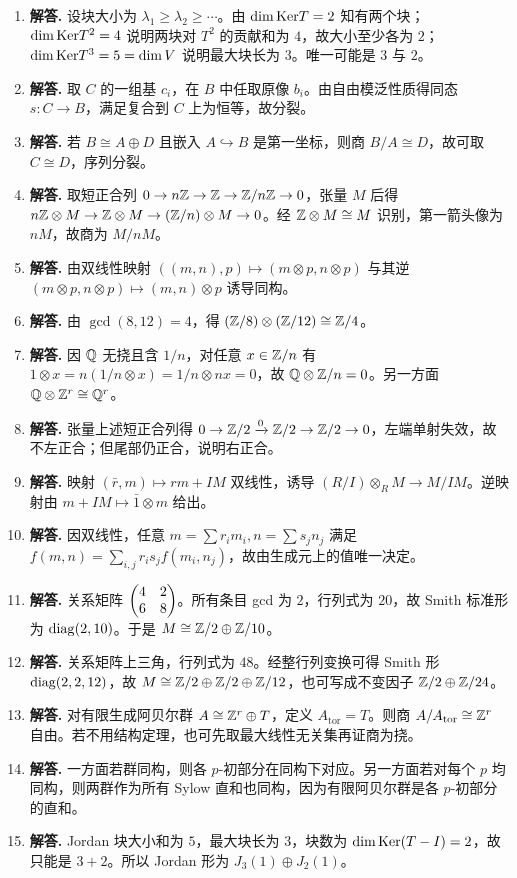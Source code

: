 \begin{enumerate}[label=\textbf{\arabic*.}, leftmargin=*, itemsep=1em]
\item \textbf{解答.} 设块大小为 $\lambda_1\ge\lambda_2\ge\cdots$。由 $\dim\mathrm{Ker} T=2$ 知有两个块；$\dim\mathrm{Ker} T^2=4$ 说明两块对 $T^2$ 的贡献和为 $4$，故大小至少各为 $2$；$\dim\mathrm{Ker} T^3=5=\dim V$ 说明最大块长为 $3$。唯一可能是 $3$ 与 $2$。
\item \textbf{解答.} 取 $C$ 的一组基 $c_i$，在 $B$ 中任取原像 $b_i$。由自由模泛性质得同态 $s:C\to B$，满足复合到 $C$ 上为恒等，故分裂。
\item \textbf{解答.} 若 $B\cong A\oplus D$ 且嵌入 $A\hookrightarrow B$ 是第一坐标，则商 $B/A\cong D$，故可取 $C\cong D$，序列分裂。
\item \textbf{解答.} 取短正合列 $0\to n\mathbb{Z}\to \mathbb{Z}\to \mathbb{Z}/n\mathbb{Z}\to 0$，张量 $M$ 后得 $n\mathbb{Z}\otimes M\to \mathbb{Z}\otimes M\to (\mathbb{Z}/n)\otimes M\to 0$。经 $\mathbb{Z}\otimes M\cong M$ 识别，第一箭头像为 $nM$，故商为 $M/nM$。
\item \textbf{解答.} 由双线性映射
$((m,n),p)\mapsto (m\otimes p,n\otimes p)$
与其逆 $(m\otimes p,n\otimes p)\mapsto (m,n)\otimes p$ 诱导同构。
\item \textbf{解答.} 由 $\gcd(8,12)=4$，得 $(\mathbb{Z}/8)\otimes(\mathbb{Z}/12)\cong \mathbb{Z}/4$。
\item \textbf{解答.} 因 $\mathbb{Q}$ 无挠且含 $1/n$，对任意 $x\in \mathbb{Z}/n$ 有 $1\otimes x=n(1/n\otimes x)=1/n\otimes nx=0$，故 $\mathbb{Q}\otimes \mathbb{Z}/n=0$。另一方面 $\mathbb{Q}\otimes \mathbb{Z}^r\cong \mathbb{Q}^r$。
\item \textbf{解答.} 张量上述短正合列得 $0\to \mathbb{Z}/2\xrightarrow{0}\mathbb{Z}/2\to \mathbb{Z}/2\to 0$，左端单射失效，故不左正合；但尾部仍正合，说明右正合。
\item \textbf{解答.} 映射 $(\bar r,m)\mapsto rm+IM$ 双线性，诱导 $(R/I)\otimes_R M\to M/IM$。逆映射由 $m+IM\mapsto \bar1\otimes m$ 给出。
\item \textbf{解答.} 因双线性，任意 $m=\sum r_im_i,n=\sum s_jn_j$ 满足
$f(m,n)=\sum_{i,j}r_is_jf(m_i,n_j)$，故由生成元上的值唯一决定。
\item \textbf{解答.} 关系矩阵 $\begin{pmatrix} 4&2\\6&8 \end{pmatrix}$。所有条目 gcd 为 $2$，行列式为 $20$，故 Smith 标准形为 $\mathrm{diag}(2,10)$。于是 $M\cong \mathbb{Z}/2\oplus \mathbb{Z}/10$。
\item \textbf{解答.} 关系矩阵上三角，行列式为 $48$。经整行列变换可得 Smith 形 $\mathrm{diag}(2,2,12)$，故 $M\cong \mathbb{Z}/2\oplus \mathbb{Z}/2\oplus \mathbb{Z}/12$，也可写成不变因子 $\mathbb{Z}/2\oplus \mathbb{Z}/24$。
\item \textbf{解答.} 对有限生成阿贝尔群 $A\cong \mathbb{Z}^r\oplus T$，定义 $A_{\mathrm{tor}}=T$。则商 $A/A_{\mathrm{tor}}\cong \mathbb{Z}^r$ 自由。若不用结构定理，也可先取最大线性无关集再证商为挠。
\item \textbf{解答.} 一方面若群同构，则各 $p$-初部分在同构下对应。另一方面若对每个 $p$ 均同构，则两群作为所有 Sylow 直和也同构，因为有限阿贝尔群是各 $p$-初部分的直和。
\item \textbf{解答.} Jordan 块大小和为 $5$，最大块长为 $3$，块数为 $\dim\mathrm{Ker}(T-I)=2$，故只能是 $3+2$。所以 Jordan 形为 $J_3(1)\oplus J_2(1)$。
\end{enumerate}
